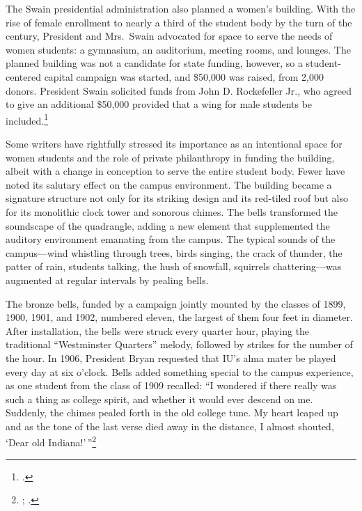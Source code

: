 \documentclass[
  american,
  letterpaper,
]{scrreprt}
\begin{document}
The Swain presidential administration also planned a women's building.
With the rise of female enrollment to nearly a third of the student body
by the turn of the century, President and Mrs.~Swain advocated for space
to serve the needs of women students: a gymnasium, an auditorium,
meeting rooms, and lounges. The planned building was not a candidate for
state funding, however, so a student-centered capital campaign was
started, and \$50,000 was raised, from 2,000 donors. President Swain
solicited funds from John D. Rockefeller Jr., who agreed to give an
additional \$50,000 provided that a wing for male students be
included.\footnote{.}

Some writers have rightfully stressed its importance as an intentional
space for women students and the role of private philanthropy in funding
the building, albeit with a change in conception to serve the entire
student body. Fewer have noted its salutary effect on the campus
environment. The building became a signature structure not only for its
striking design and its red-tiled roof but also for its monolithic clock
tower and sonorous chimes. The bells transformed the soundscape of the
quadrangle, adding a new element that supplemented the auditory
environment emanating from the campus. The typical sounds of the
campus---wind whistling through trees, birds singing, the crack of
thunder, the patter of rain, students talking, the hush of snowfall,
squirrels chattering---was augmented at regular intervals by pealing
bells.

The bronze bells, funded by a campaign jointly mounted by the classes of
1899, 1900, 1901, and 1902, numbered eleven, the largest of them four
feet in diameter. After installation, the bells were struck every
quarter hour, playing the traditional ``Westminster Quarters'' melody,
followed by strikes for the number of the hour. In 1906, President Bryan
requested that IU's alma mater be played every day at six o'clock. Bells
added something special to the campus experience, as one student from
the class of 1909 recalled: ``I wondered if there really was such a
thing as college spirit, and whether it would ever descend on me.
Suddenly, the chimes pealed forth in the old college tune. My heart
leaped up and as the tone of the last verse died away in the distance, I
almost shouted, `Dear old Indiana!'\,''\footnote{;
  .}
\end{document}
